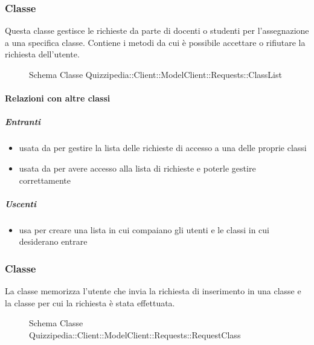 \subsubsection{Classe }
Questa classe gestisce le richieste da parte di docenti o studenti per l'assegnazione a una specifica classe. Contiene i metodi da cui è possibile accettare o rifiutare la richiesta dell'utente.
\begin{figure}[H]
\centering
\noindent{}
\caption[Schema Classe ClassList]{Schema Classe Quizzipedia::Client::ModelClient::Requests::ClassList}
\end{figure}
\paragraph{Relazioni con altre classi}
\subparagraph{Entranti}
\begin{itemize}
\item usata da  per gestire la lista delle richieste di accesso a una delle proprie classi
\item usata da  per avere accesso alla lista di richieste e poterle gestire correttamente
\end{itemize}
\subparagraph{Uscenti}
\begin{itemize}
\item usa  per creare una lista in cui compaiano gli utenti e le classi in cui desiderano entrare
\end{itemize}
\subsubsection{Classe }
La classe memorizza l'utente che invia la richiesta di inserimento in una classe e la classe per cui la richiesta è stata effettuata.
\begin{figure}[H]
\centering
\noindent{}
\caption[Schema Classe RequestClass]{Schema Classe Quizzipedia::Client::ModelClient::Requests::RequestClass}
\end{figure}
